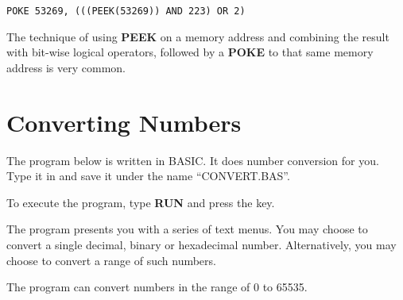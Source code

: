 \begin{tcolorbox}[colback=black,coltext=white]
\verbatimfont{\codefont}
\begin{verbatim}
POKE 53269, (((PEEK(53269)) AND 223) OR 2)
\end{verbatim}
\end{tcolorbox}

The technique of using {\bf PEEK} on a memory address and combining the result with bit-wise logical operators, followed by a {\bf POKE} to that same memory address is very common.

\section{Converting Numbers}

The program below is written in BASIC. It does number conversion for you. Type it in and save it under the name ``CONVERT.BAS''.

To execute the program, type {\bf RUN} and press the  key.

The program presents you with a series of text menus. You may choose to convert a single decimal, binary or hexadecimal number. Alternatively, you may choose to convert a range of such numbers.

The program can convert numbers in the range of 0 to 65535.

